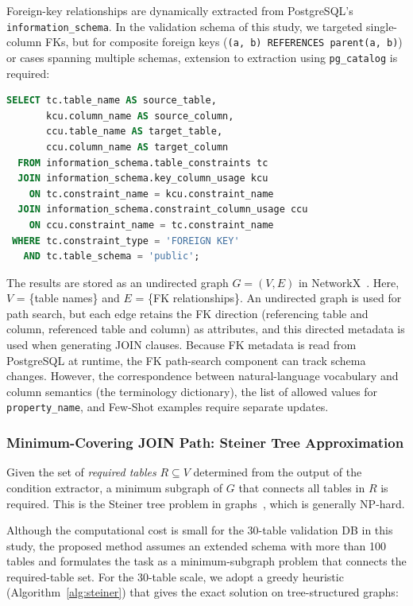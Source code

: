 \documentclass[5p,twocolumn]{elsarticle}
\begin{document}
Foreign-key relationships are dynamically extracted from PostgreSQL's \texttt{information\_schema}.
In the validation schema of this study, we targeted single-column FKs, but
for composite foreign keys (\texttt{(a, b) REFERENCES parent(a, b)}) or
cases spanning multiple schemas, extension to extraction using \texttt{pg\_catalog} is required:

\begin{lstlisting}[language=SQL,caption={FK relationship extraction query.},label=lst:fk_query]
SELECT tc.table_name AS source_table,
       kcu.column_name AS source_column,
       ccu.table_name AS target_table,
       ccu.column_name AS target_column
  FROM information_schema.table_constraints tc
  JOIN information_schema.key_column_usage kcu
    ON tc.constraint_name = kcu.constraint_name
  JOIN information_schema.constraint_column_usage ccu
    ON ccu.constraint_name = tc.constraint_name
 WHERE tc.constraint_type = 'FOREIGN KEY'
   AND tc.table_schema = 'public';
\end{lstlisting}

The results are stored as an undirected graph $G = (V, E)$ in NetworkX~\citep{networkx2008}.
Here, $V$ = \{table names\} and $E$ = \{FK relationships\}.
An undirected graph is used for path search, but each edge retains the FK direction
(referencing table and column, referenced table and column) as attributes,
and this directed metadata is used when generating JOIN clauses.
Because FK metadata is read from PostgreSQL at runtime,
the FK path-search component can track schema changes.
However, the correspondence between natural-language vocabulary and column semantics
(the terminology dictionary),
the list of allowed values for \texttt{property\_name}, and Few-Shot examples require separate updates.

\subsubsection{Minimum-Covering JOIN Path: Steiner Tree Approximation}
\label{sec:steiner}

Given the set of \textit{required tables} $R \subseteq V$ determined from the output of the condition extractor,
a minimum subgraph of $G$ that connects all tables in $R$ is required.
This is the Steiner tree problem in graphs~\citep{hwang1992steiner}, which is generally NP-hard.

Although the computational cost is small for the 30-table validation DB in this study,
the proposed method assumes an extended schema with more than 100 tables
and formulates the task as a minimum-subgraph problem that connects the required-table set.
For the 30-table scale, we adopt a greedy heuristic
(Algorithm~\ref{alg:steiner}) that gives the exact solution on tree-structured graphs:
\end{document}
